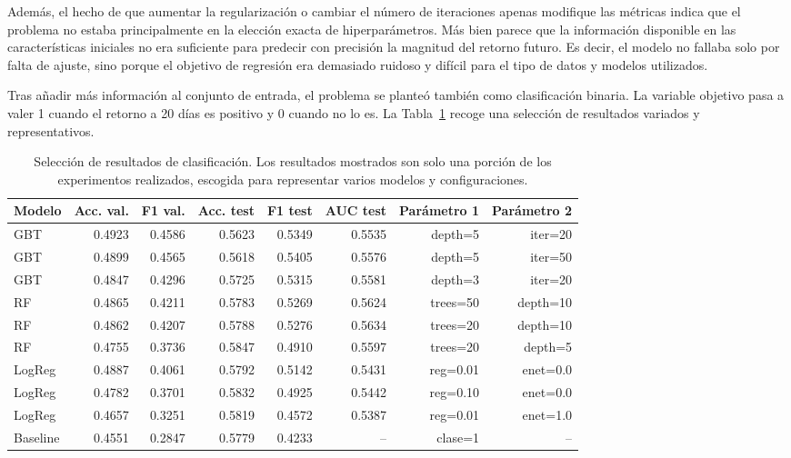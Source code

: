 \documentclass[runningheads]{llncs}
\begin{document}
Además, el hecho de que aumentar la regularización o cambiar el número de iteraciones apenas modifique las métricas indica que el problema no estaba principalmente en la elección exacta de hiperparámetros. Más bien parece que la información disponible en las características iniciales no era suficiente para predecir con precisión la magnitud del retorno futuro. Es decir, el modelo no fallaba solo por falta de ajuste, sino porque el objetivo de regresión era demasiado ruidoso y difícil para el tipo de datos y modelos utilizados.

Tras añadir más información al conjunto de entrada, el problema se planteó también como clasificación binaria. La variable objetivo pasa a valer 1 cuando el retorno a 20 días es positivo y 0 cuando no lo es. La Tabla~\ref{tab:clasificacion_resultados} recoge una selección de resultados variados y representativos.

\begin{table}[htbp]
\centering
\scriptsize
\begin{tabular}{lrrrrrrr}
\hline
Modelo & Acc. val. & F1 val. & Acc. test & F1 test & AUC test & Parámetro 1 & Parámetro 2 \\
\hline
GBT & 0.4923 & 0.4586 & 0.5623 & 0.5349 & 0.5535 & depth=5 & iter=20 \\
GBT & 0.4899 & 0.4565 & 0.5618 & 0.5405 & 0.5576 & depth=5 & iter=50 \\
GBT & 0.4847 & 0.4296 & 0.5725 & 0.5315 & 0.5581 & depth=3 & iter=20 \\
RF  & 0.4865 & 0.4211 & 0.5783 & 0.5269 & 0.5624 & trees=50 & depth=10 \\
RF  & 0.4862 & 0.4207 & 0.5788 & 0.5276 & 0.5634 & trees=20 & depth=10 \\
RF  & 0.4755 & 0.3736 & 0.5847 & 0.4910 & 0.5597 & trees=20 & depth=5 \\
LogReg & 0.4887 & 0.4061 & 0.5792 & 0.5142 & 0.5431 & reg=0.01 & enet=0.0 \\
LogReg & 0.4782 & 0.3701 & 0.5832 & 0.4925 & 0.5442 & reg=0.10 & enet=0.0 \\
LogReg & 0.4657 & 0.3251 & 0.5819 & 0.4572 & 0.5387 & reg=0.01 & enet=1.0 \\
Baseline & 0.4551 & 0.2847 & 0.5779 & 0.4233 & -- & clase=1 & -- \\
\hline
\end{tabular}
\caption{Selección de resultados de clasificación. Los resultados mostrados son solo una porción de los experimentos realizados, escogida para representar varios modelos y configuraciones.}
\label{tab:clasificacion_resultados}
\end{table}
\end{document}
